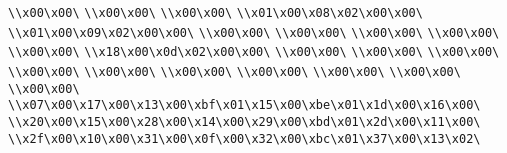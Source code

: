\verb|\\x00\x00\|\newline
\verb|\\x00\x00\|\newline
\verb|\\x00\x00\|\newline
\verb|\\x01\x00\x08\x02\x00\x00\|\newline
\verb|\\x01\x00\x09\x02\x00\x00\|\newline
\verb|\\x00\x00\|\newline
\verb|\\x00\x00\|\newline
\verb|\\x00\x00\|\newline
\verb|\\x00\x00\|\newline
\verb|\\x00\x00\|\newline
\verb|\\x18\x00\x0d\x02\x00\x00\|\newline
\verb|\\x00\x00\|\newline
\verb|\\x00\x00\|\newline
\verb|\\x00\x00\|\newline
\verb|\\x00\x00\|\newline
\verb|\\x00\x00\|\newline
\verb|\\x00\x00\|\newline
\verb|\\x00\x00\|\newline
\verb|\\x00\x00\|\newline
\verb|\\x00\x00\|\newline
\verb|\\x00\x00\|\newline
\verb|\\x07\x00\x17\x00\x13\x00\xbf\x01\x15\x00\xbe\x01\x1d\x00\x16\x00\|\newline
\verb|\\x20\x00\x15\x00\x28\x00\x14\x00\x29\x00\xbd\x01\x2d\x00\x11\x00\|\newline
\verb|\\x2f\x00\x10\x00\x31\x00\x0f\x00\x32\x00\xbc\x01\x37\x00\x13\x02\|\newline

